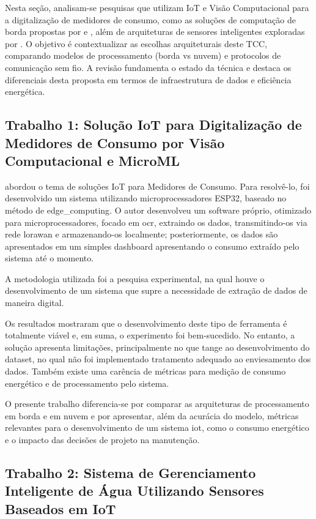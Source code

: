 Nesta seção, analisam-se pesquisas que utilizam IoT e Visão Computacional para a digitalização de medidores de consumo, como as soluções de computação de borda propostas por  e , além de arquiteturas de sensores inteligentes exploradas por . 
O objetivo é contextualizar as escolhas arquiteturais deste TCC, comparando modelos de processamento (borda vs nuvem) e protocolos de comunicação sem fio. 
A revisão fundamenta o estado da técnica e destaca os diferenciais desta proposta em termos de infraestrutura de dados e eficiência energética.

\subsection{Trabalho 1: Solução IoT para Digitalização de Medidores de Consumo por Visão Computacional e MicroML}

 abordou o tema de soluções IoT para Medidores de Consumo. 
Para resolvê-lo, foi desenvolvido um sistema utilizando microprocessadores ESP32, baseado no método de \gls{edge_computing}. O autor desenvolveu um software próprio, otimizado para microprocessadores, focado em \gls{ocr}, extraindo os dados, transmitindo-os via rede \gls{lorawan} e armazenando-os localmente; posteriormente, os dados são apresentados em um simples dashboard apresentando o consumo extraído pelo sistema até o momento. 

A metodologia utilizada foi a pesquisa experimental, na qual houve o desenvolvimento de um sistema que supre a necessidade de extração de dados de maneira digital. 

Os resultados mostraram que o desenvolvimento deste tipo de ferramenta é totalmente viável e, em suma, o experimento foi bem-sucedido. 
No entanto, a solução apresenta limitações, principalmente no que tange ao desenvolvimento do dataset, no qual não foi implementado tratamento adequado ao enviesamento dos dados. 
Também existe uma carência de métricas para medição de consumo energético e de processamento pelo sistema.

O presente trabalho diferencia-se por comparar as arquiteturas de processamento em borda e em nuvem e por apresentar, além da acurácia do modelo, métricas relevantes para o desenvolvimento de um sistema \gls{iot}, como o consumo energético e o impacto das decisões de projeto na manutenção.

\subsection{Trabalho 2: Sistema de Gerenciamento Inteligente de Água Utilizando Sensores Baseados em IoT}


